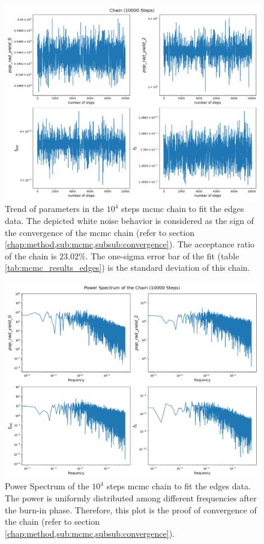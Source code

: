\documentclass[12pt, TexShade, letterpaper]{report}
\begin{document}
\begin{figure}[h!]
\centering
\includegraphics[scale =0.5]{chain_edges.png}
\caption[Trend of parameters in the \gls{edges} data \gls{mcmc} chain]{Trend of parameters in the $10^4$ steps \gls{mcmc} chain to fit the \gls{edges} data. The depicted white noise behavior is considered as the sign of the convergence of the \gls{mcmc} chain (refer to section \ref{chap:method,sub:mcmc,subsub:convergence}). The acceptance ratio of the chain is  $23.02\%$. The one-sigma error bar of the fit (table \ref{tab:mcmc_results_edges}) is the standard deviation of this chain.} 
\label{fig:chain_edges}
\end{figure}

\begin{figure}[h!]
\centering
\includegraphics[scale =0.5]{power_spectrum_edges.png}
\caption[Power spectrum of \gls{edges} data \gls{mcmc} chain]{Power Spectrum of the $10^4$ steps \gls{mcmc} chain to fit the \gls{edges} data. The power is uniformly distributed among different frequencies after the burn-in phase. Therefore, this plot is the proof of convergence of the chain (refer to section \ref{chap:method,sub:mcmc,subsub:convergence}).}
\label{fig:Power_spectrum_edges}
\end{figure}
\end{document}
